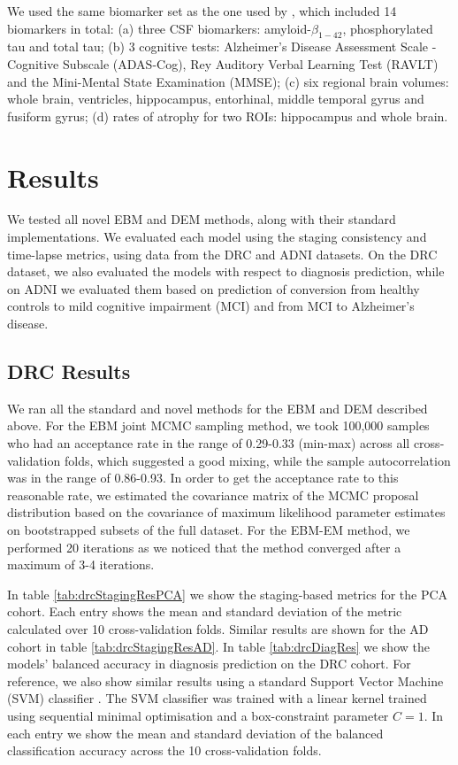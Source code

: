 We used the same biomarker set as the one used by \cite{young2014data}, which included 14 biomarkers in total: (a) three CSF biomarkers: amyloid-$\beta_{1-42}$, phosphorylated tau and total tau; (b) 3 cognitive tests: Alzheimer's Disease Assessment Scale - Cognitive Subscale (ADAS-Cog), Rey Auditory Verbal Learning Test (RAVLT) and the Mini-Mental State Examination (MMSE); (c) six regional brain volumes: whole brain, ventricles, hippocampus, entorhinal, middle temporal gyrus and fusiform gyrus; (d) rates of atrophy for two ROIs: hippocampus and whole brain.

\section{Results}
\label{sec:perfRes}

We tested all novel EBM and DEM methods, along with their standard implementations. We evaluated each model using the staging consistency and time-lapse metrics, using data from the DRC and ADNI datasets. On the DRC dataset, we also evaluated the models with respect to diagnosis prediction, while on ADNI we evaluated them based on prediction of conversion from healthy controls to mild cognitive impairment (MCI) and from MCI to Alzheimer's disease.

\subsection{DRC Results}
\label{sec:perfResDrc}

We ran all the standard and novel methods for the EBM and DEM described above. For the EBM joint MCMC sampling method, we took 100,000 samples who had an acceptance rate in the range of 0.29-0.33 (min-max) across all cross-validation folds, which suggested a good mixing, while the sample autocorrelation was in the range of 0.86-0.93. In order to get the acceptance rate to this reasonable rate, we estimated the covariance matrix  of the MCMC proposal distribution based on the covariance of maximum likelihood parameter estimates on bootstrapped subsets of the full dataset. For the EBM-EM method, we performed 20 iterations as we noticed that the method converged after a maximum of 3-4 iterations.

In table \ref{tab:drcStagingResPCA} we show the staging-based metrics for the PCA cohort. Each entry shows the mean and standard deviation of the metric calculated over 10 cross-validation folds. Similar results are shown for the AD cohort in table \ref{tab:drcStagingResAD}. In table \ref{tab:drcDiagRes} we show the models' balanced accuracy in diagnosis prediction on the DRC cohort. For reference, we also show similar results using a standard Support Vector Machine (SVM) classifier \cite{vapnik2006estimation}. The SVM classifier was trained with a linear kernel trained using sequential minimal optimisation \cite{platt1998sequential} and a box-constraint parameter $C=1$. In each entry we show the mean and standard deviation of the balanced classification accuracy across the 10 cross-validation folds. 

